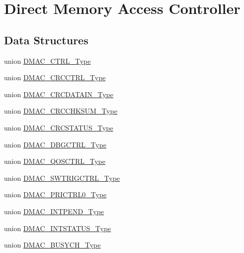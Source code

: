 \hypertarget{group___s_a_m_d21___d_m_a_c}{}\section{Direct Memory Access Controller}
\label{group___s_a_m_d21___d_m_a_c}
\subsection*{Data Structures}
\begin{DoxyCompactItemize}
\item 
union \mbox{\hyperlink{union_d_m_a_c___c_t_r_l___type}{D\+M\+A\+C\+\_\+\+C\+T\+R\+L\+\_\+\+Type}}
\item 
union \mbox{\hyperlink{union_d_m_a_c___c_r_c_c_t_r_l___type}{D\+M\+A\+C\+\_\+\+C\+R\+C\+C\+T\+R\+L\+\_\+\+Type}}
\item 
union \mbox{\hyperlink{union_d_m_a_c___c_r_c_d_a_t_a_i_n___type}{D\+M\+A\+C\+\_\+\+C\+R\+C\+D\+A\+T\+A\+I\+N\+\_\+\+Type}}
\item 
union \mbox{\hyperlink{union_d_m_a_c___c_r_c_c_h_k_s_u_m___type}{D\+M\+A\+C\+\_\+\+C\+R\+C\+C\+H\+K\+S\+U\+M\+\_\+\+Type}}
\item 
union \mbox{\hyperlink{union_d_m_a_c___c_r_c_s_t_a_t_u_s___type}{D\+M\+A\+C\+\_\+\+C\+R\+C\+S\+T\+A\+T\+U\+S\+\_\+\+Type}}
\item 
union \mbox{\hyperlink{union_d_m_a_c___d_b_g_c_t_r_l___type}{D\+M\+A\+C\+\_\+\+D\+B\+G\+C\+T\+R\+L\+\_\+\+Type}}
\item 
union \mbox{\hyperlink{union_d_m_a_c___q_o_s_c_t_r_l___type}{D\+M\+A\+C\+\_\+\+Q\+O\+S\+C\+T\+R\+L\+\_\+\+Type}}
\item 
union \mbox{\hyperlink{union_d_m_a_c___s_w_t_r_i_g_c_t_r_l___type}{D\+M\+A\+C\+\_\+\+S\+W\+T\+R\+I\+G\+C\+T\+R\+L\+\_\+\+Type}}
\item 
union \mbox{\hyperlink{union_d_m_a_c___p_r_i_c_t_r_l0___type}{D\+M\+A\+C\+\_\+\+P\+R\+I\+C\+T\+R\+L0\+\_\+\+Type}}
\item 
union \mbox{\hyperlink{union_d_m_a_c___i_n_t_p_e_n_d___type}{D\+M\+A\+C\+\_\+\+I\+N\+T\+P\+E\+N\+D\+\_\+\+Type}}
\item 
union \mbox{\hyperlink{union_d_m_a_c___i_n_t_s_t_a_t_u_s___type}{D\+M\+A\+C\+\_\+\+I\+N\+T\+S\+T\+A\+T\+U\+S\+\_\+\+Type}}
\item 
union \mbox{\hyperlink{union_d_m_a_c___b_u_s_y_c_h___type}{D\+M\+A\+C\+\_\+\+B\+U\+S\+Y\+C\+H\+\_\+\+Type}}
\item 

\end{DoxyCompactItemize}
